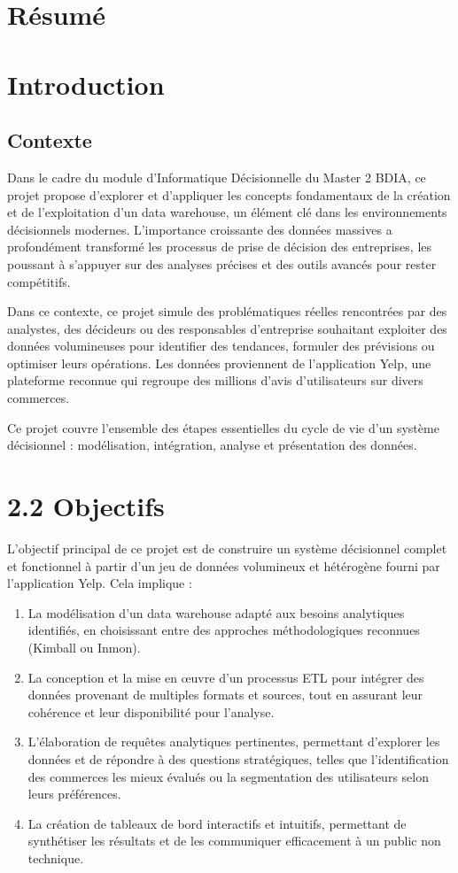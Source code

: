 \section*{Résumé}


\section*{Introduction}

\subsection{Contexte}\label{subsec:contexte}
Dans le cadre du module d’Informatique Décisionnelle du Master 2 BDIA, ce projet propose d’explorer et d’appliquer les concepts fondamentaux de la création et de l’exploitation d’un data warehouse, un élément clé dans les environnements décisionnels modernes. L’importance croissante des données massives a profondément transformé les processus de prise de décision des entreprises, les poussant à s’appuyer sur des analyses précises et des outils avancés pour rester compétitifs.

Dans ce contexte, ce projet simule des problématiques réelles rencontrées par des analystes, des décideurs ou des responsables d’entreprise souhaitant exploiter des données volumineuses pour identifier des tendances, formuler des prévisions ou optimiser leurs opérations. Les données proviennent de l’application Yelp, une plateforme reconnue qui regroupe des millions d’avis d’utilisateurs sur divers commerces. 

Ce projet couvre l’ensemble des étapes essentielles du cycle de vie d’un système décisionnel : modélisation, intégration, analyse et présentation des données. 


\section*{2.2 Objectifs}
L’objectif principal de ce projet est de construire un système décisionnel complet et fonctionnel à partir d’un jeu de données volumineux et hétérogène fourni par l’application Yelp. Cela implique :

\begin{enumerate}
\item La modélisation d’un data warehouse adapté aux besoins analytiques identifiés, en choisissant entre des approches méthodologiques reconnues (Kimball ou Inmon).
\item La conception et la mise en œuvre d’un processus ETL pour intégrer des données provenant de multiples formats et sources, tout en assurant leur cohérence et leur disponibilité pour l’analyse.
\item L’élaboration de requêtes analytiques pertinentes, permettant d'explorer les données et de répondre à des questions stratégiques, telles que l’identification des commerces les mieux évalués ou la segmentation des utilisateurs selon leurs préférences.
\item La création de tableaux de bord interactifs et intuitifs, permettant de synthétiser les résultats et de les communiquer efficacement à un public non technique.
\end{enumerate}

